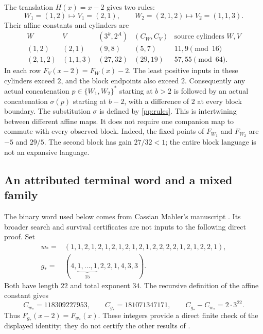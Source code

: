 The translation $H(x)=x-2$ gives two rules:
\begin{equation}\label{pp:rules}
 W_1=(1,2)\longmapsto V_1=(2,1),\qquad
 W_2=(2,1,2)\longmapsto V_2=(1,1,3).
\end{equation}
Their affine constants and cylinders are
\[
\begin{array}{c|c|c|c|c}
 W&V&(3^k,2^A)&(C_W,C_V)&\text{source cylinders }W,V\\ \hline
 (1,2)&(2,1)&(9,8)&(5,7)&11,9\pmod {16}\\
 (2,1,2)&(1,1,3)&(27,32)&(29,19)&57,55\pmod {64}.
\end{array}
\]
In each row $F_V(x-2)=F_W(x)-2$. The least positive inputs
in these cylinders exceed $2$, and the block endpoints also exceed $2$.
Consequently any actual concatenation $p\in\{W_1,W_2\}^*$ starting
at $b>2$ is followed by an actual concatenation $\sigma(p)$ starting
at $b-2$, with a difference of $2$ at every block boundary.
The substitution $\sigma$ is defined by \eqref{pp:rules}.
This is intertwining between different affine maps. It does not require
one companion map to commute with every observed block. Indeed, the
fixed points of $F_{W_1}$ and $F_{W_2}$ are $-5$ and $29/5$.
The second block has gain $27/32<1$; the entire block language is not
an expansive language.

\subsection{An attributed terminal word and a mixed family}

The binary word used below comes from Cassian Mahler's manuscript
\cite[Section~4, Equation~(4.4)]{mahler152}. Its broader search and
survival certificates are not inputs to the following direct proof.
Set
\begin{align*}
 w_*={}&(1,1,2,1,2,1,2,1,2,1,2,1,2,2,2,2,1,2,1,2,2,1),\\
 g_*={}&(4,\underbrace{1,\ldots,1}_{15},2,2,1,4,3,3).
\end{align*}
Both have length $22$ and total exponent $34$. The recursive definition
of the affine constant gives
\[
 C_{w_*}=118309227953,\qquad C_{g_*}=181071347171,
 \qquad C_{g_*}-C_{w_*}=2\cdot3^{22}.
\]
Thus $F_{g_*}(x-2)=F_{w_*}(x)$. These integers provide a direct finite
check of the displayed identity; they do not certify the other results
of \cite{mahler152}.

